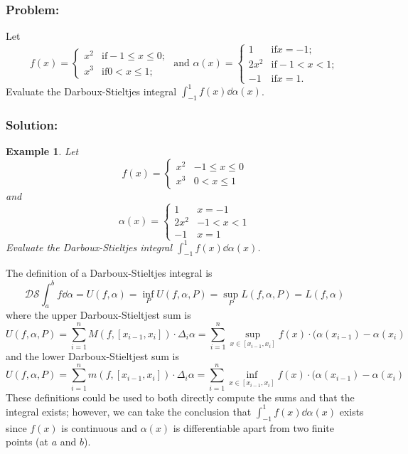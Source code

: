 \documentclass[]{article}
\newtheorem{example}{Example}
\begin{document}
\newpage
\section{}
\subsubsection*{Problem:}
Let \[
    f(x) = \begin{cases}
        x^2 &\text{if} -1 \leq x \leq 0;\\
        x^3 &\text{if} 0 < x \leq 1;
    \end{cases}
    \text{ and } 
    \alpha(x) = \begin{cases}
        1   &\text{if} x = -1;\\
        2 x^2   &\text{if} -1 < x < 1;\\
        -1  &\text{if} x = 1.
    \end{cases}
\]
Evaluate the Darboux-Stieltjes integral $\int_{-1}^{1} f(x) \dd{\alpha(x)}$.

\subsubsection*{Solution:}
\begin{example}
    Let \[
        f(x) = \begin{cases}
            x^2 & -1 \leq x \leq 0\\
            x^3 &  0 < x \leq 1
        \end{cases}
    \] and \[
        \alpha(x) = \begin{cases}
            1   & x = -1\\
            2 x^2   & -1 < x < 1\\
            -1  & x = 1
        \end{cases}
    \] Evaluate the Darboux-Stieltjes integral $\int_{-1}^{1} f(x) \dd{\alpha(x)}$.
\end{example}
The definition of a Darboux-Stieltjes integral is \[
    \mathcal{DS} \int_{a}^{b} f \dd{\alpha} 
    = U(f, \alpha) = \inf_{P} U(f, \alpha, P)
    = \sup_{P} L(f, \alpha, P) = L(f, \alpha)
\] where the upper Darboux-Stieltjest sum is \[
    U(f, \alpha, P) 
    = \sum_{i=1}^{n} M(f, [x_{i-1}, x_i]) \cdot \Delta_i \alpha
    = \sum_{i=1}^{n} \sup_{x \in [x_{i-1}, x_i]} f(x) \cdot (\alpha(x_{i-1}) - \alpha(x_{i})
\] and the lower Darboux-Stieltjest sum is \[
    U(f, \alpha, P) 
    = \sum_{i=1}^{n} m(f, [x_{i-1}, x_i]) \cdot \Delta_i \alpha
    = \sum_{i=1}^{n} \inf_{x \in [x_{i-1}, x_i]} f(x) \cdot (\alpha(x_{i-1}) - \alpha(x_{i})
\] These definitions could be used to both directly compute the sums and that the integral exists; however, we can take the conclusion that $\int_{-1}^{1} f(x) \dd{\alpha(x)}$ exists since $f(x)$ is continuous and $\alpha(x)$ is differentiable apart from two finite points (at $a$ and $b$).
\end{document}
